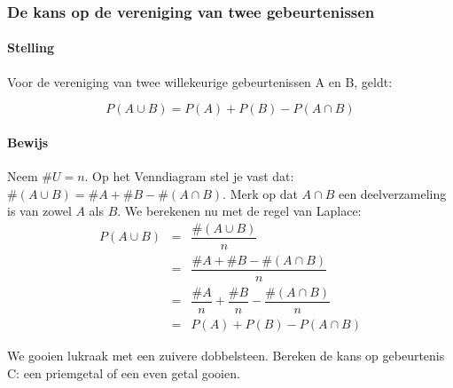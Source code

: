 \documentclass[12pt,twoside]{article}
\begin{document}
\begin{samepage}
\subsubsection{De kans op de vereniging van twee gebeurtenissen}

\paragraph*{Stelling }Voor de vereniging van twee willekeurige gebeurtenissen A en B, geldt:\\
\begin{mdframed}
$$P(A \cup B) = P(A) + P(B) - P(A \cap B)$$
\end{mdframed}

\paragraph*{Bewijs}
\begin{center}
\end{center}
Neem $\#U = n$. Op het Venndiagram stel je vast dat: $\#(A\cup B)=\#A + \#B - \#(A\cap B)$. Merk op dat $A \cap B$ een deelverzameling is van zowel $A$ als $B$. We berekenen nu met de regel van Laplace:
\begin{eqnarray*}
  P(A \cup B) &=& \dfrac{\#(A \cup B)}{n}\\
              &=& \dfrac{\#A + \#B - \#(A\cap B)}{n}\\
              &=& \dfrac{\#A}{n} + \dfrac{\#B}{n} - \dfrac{\#(A\cap B)}{n}\\
              &=& P(A) + P(B) - P(A\cap B)
\end{eqnarray*}
\end{samepage}

\begin{oefening}
We gooien lukraak met een zuivere dobbelsteen. Bereken de kans op gebeurtenis C:
een priemgetal of een even getal gooien.
\end{oefening}
\end{document}
